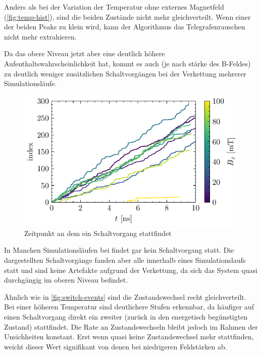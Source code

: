 \documentclass[main.tex]{subfiles}
\begin{document}
Anders als bei der Variation der Temperatur ohne externes Magnetfeld (\cref{fig:temp-hist}), sind die beiden Zustände nicht mehr gleichverteilt. Wenn einer der beiden Peaks zu klein wird, kann der Algorithmus das Telegrafenrauschen nicht mehr extrahieren. 

Da das obere Niveau jetzt aber eine deutlich höhere Aufenthaltswahrscheinlichkeit hat, kommt es auch (je nach stärke des B-Feldes) zu deutlich weniger zusätzlichen Schaltvorgängen bei der Verkettung mehrerer Simulationsläufe.


\begin{figure}[H]
    \centering
    \includegraphics{bilder/plots/max_Bz/switch_events.pdf}
    \caption{Zeitpunkt an dem ein Schaltvorgang stattfindet}\label{fig:bc-switch-events}   
\end{figure}


In Manchen Simulationsläufen bei  findet gar kein Schaltvorgang statt. Die dargestellten Schaltvorgänge fanden aber alle innerhalb eines Simulationslaufs statt und sind keine Artefakte aufgrund der Verkettung, da sich das System quasi durchgängig im oberen Niveau befindet.

Ähnlich wie in \cref{fig:switch-events} sind die Zustandswechsel recht gleichverteilt. Bei einer höheren Temperatur sind deutlichere Stufen erkennbar, da häufiger auf einen Schaltvorgang direkt ein zweiter (zurück in den energetisch begünstigten Zustand) stattfindet. Die Rate an Zustandswechseln bleibt jedoch im Rahmen der Unsichheiten konstant. Erst wenn quasi keine Zustandswechsel mehr stattfinden, weicht dieser Wert signifikant von denen bei niedrigeren Feldstärken ab. 
\end{document}
